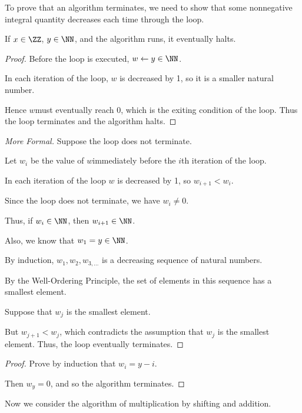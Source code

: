 \documentclass[11pt]{scrartcl}
\begin{document}
To prove that an algorithm terminates, we need to show that some nonnegative integral quantity decreases each time through the loop.

\begin{lemma}
If $x\in \ZZ$, $y\in\NN$, and the algorithm runs, it eventually halts.
\end{lemma}

\begin{proof}
  \hfill

  Before the loop is executed, $w\gets y \in \NN$.

  In each iteration of the loop, $w$ is decreased by 1, so it is a smaller natural number.

  Hence $w$must eventually reach 0, which is the exiting condition of
  the loop. Thus the loop terminates and the algorithm halts.
\end{proof}

\begin{proof}[\textit{More Formal}]
  \hfill

  Suppose the loop does not terminate.

  Let $w_{i}$ be the value of $w$immediately before the $i$th
  iteration of the loop.

  In each iteration of the loop $w$ is decreased by 1, so $w_{i+1}< w_i$.

  Since the loop does not terminate, we have $w_i \neq 0$.

  Thus, if $w_i\in\NN$, then $w_{i+1}\in\NN$.

  Also, we know that $w_1=y\in\NN$.

  By induction, $w_1, w_2, w_{3, \dots}$ is a decreasing sequence of
  natural numbers.

  By the Well-Ordering Principle, the set of elements in this sequence
  has a smallest element.

  Suppose that $w_{j}$ is the smallest element.

  But $w_{j+1}<w_{j}$, which contradicts the assumption that $w_j$ is
  the smallest element. Thus, the loop eventually terminates.
\end{proof}

\begin{proof}
  \hfill

  Prove by induction that $w_i=y -i$.

  Then $w_y = 0$, and so the algorithm terminates.
\end{proof}

Now we consider the algorithm of multiplication by shifting and addition.
\end{document}
